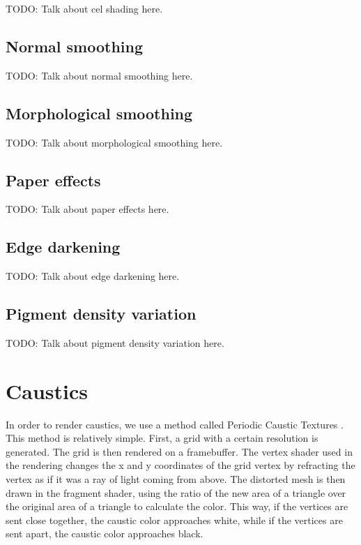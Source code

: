 \documentclass{article}
\begin{document}
TODO: Talk about cel shading here.

\subsection{Normal smoothing}

TODO: Talk about normal smoothing here.

\subsection{Morphological smoothing}

TODO: Talk about morphological smoothing here.

\subsection{Paper effects}

TODO: Talk about paper effects here.

\subsection{Edge darkening}

TODO: Talk about edge darkening here.

\subsection{Pigment density variation}

TODO: Talk about pigment density variation here.

\newpage
\section{Caustics}
\label{sec:caustics}

In order to render caustics, we use a method called Periodic Caustic Textures \cite{periodic_caustic_textures}. This method is relatively simple. First, a grid with a certain resolution is generated. The grid is then rendered on a framebuffer. The vertex shader used in the rendering changes the x and y coordinates of the grid vertex by refracting the vertex as if it was a ray of light coming from above. The distorted mesh is then drawn in the fragment shader, using the ratio of the new area of a triangle over the original area of a triangle to calculate the color. This way, if the vertices are sent close together, the caustic color approaches white, while if the vertices are sent apart, the caustic color approaches black.
\end{document}
